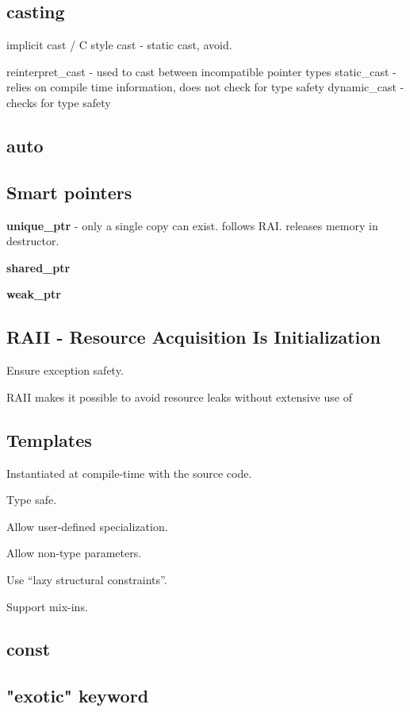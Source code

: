 \subsection{casting}

implicit cast / C style cast - static cast, avoid.

reinterpret\_cast -  used to cast between incompatible pointer types
static\_cast - relies on compile time information, does not check for type safety
dynamic\_cast - checks for type safety

\subsection{auto}

\subsection{Smart pointers}

\textbf{unique\_ptr} - only a single copy can exist. follows RAI. releases memory in destructor.

\textbf{shared\_ptr}

\textbf{weak\_ptr}

\subsection{RAII - Resource Acquisition Is Initialization}

Ensure exception safety. 

RAII makes it possible to avoid resource leaks without extensive use of

\subsection{Templates}

Instantiated at compile-time with the source code.

Type safe.

Allow user-defined specialization.

Allow non-type parameters.

Use “lazy structural constraints”.

Support mix-ins.

\subsection{const}

\subsection{"exotic" keyword}

